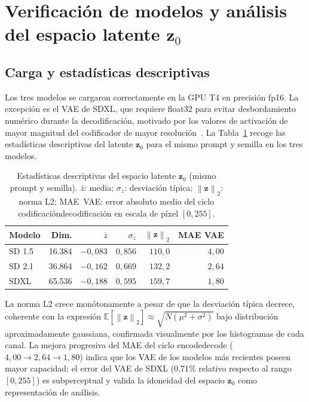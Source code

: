 \documentclass[12pt, a4paper, twoside]{book}
\newcommand{\z}{\mathbf{z}}
\newcommand{\E}{\mathbb{E}}
\newcommand{\norm}[1]{\left\|#1\right\|_2}
\begin{document}
\section{Verificación de modelos y análisis del espacio latente $\z_0$}
\label{sec:res:modelos}

\subsection{Carga y estadísticas descriptivas}

Los tres modelos se cargaron correctamente en la GPU T4 en precisión fp16.
La excepción es el VAE de SDXL, que requiere float32 para evitar desbordamiento
numérico durante la decodificación, motivado por los valores de activación de mayor magnitud
del codificador de mayor resolución~\citep{podell2023sdxl}.
La Tabla~\ref{tab:estadisticas_z0} recoge las estadísticas descriptivas del latente $\z_0$
para el mismo prompt y semilla en los tres modelos.

\begin{table}[htb]
\centering
\caption{Estadísticas descriptivas del espacio latente $\z_0$ (mismo prompt y semilla).
$\bar{z}$: media; $\sigma_z$: desviación típica; $\norm{\z}$: norma L2; MAE~VAE: error
absoluto medio del ciclo codificación\textrightarrow{}decodificación en escala de píxel $[0,255]$.}
\label{tab:estadisticas_z0}
\small
\begin{tabular}{lrrrrr}
\toprule
\textbf{Modelo} & \textbf{Dim.} & $\bar{z}$ & $\sigma_z$ & $\norm{\z}$ & \textbf{MAE VAE} \\
\midrule
SD 1.5 & 16.384 & $-0{,}083$ & $0{,}856$ & $110{,}0$ & $4{,}00$ \\
SD 2.1 & 36.864 & $-0{,}162$ & $0{,}669$ & $132{,}2$ & $2{,}64$ \\
SDXL   & 65.536 & $-0{,}188$ & $0{,}595$ & $159{,}7$ & $1{,}80$ \\
\bottomrule
\end{tabular}
\end{table}

La norma L2 crece monótonamente a pesar de que la desviación típica decrece, coherente con
la expresión $\E[\norm{\z}] \approx \sqrt{N(\mu^2 + \sigma^2)}$ bajo distribución aproximadamente
gaussiana, confirmada visualmente por los histogramas de cada canal.
La mejora progresiva del MAE del ciclo encode\textrightarrow{}decode ($4{,}00 \to 2{,}64 \to 1{,}80$)
indica que los VAE de los modelos más recientes poseen mayor capacidad; el error del VAE de SDXL
(0,71\% relativo respecto al rango $[0,255]$) es subperceptual y valida la idoneidad del espacio
$\z_0$ como representación de análisis.
\end{document}
